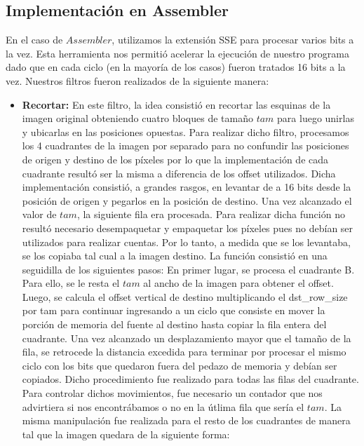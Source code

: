 \documentclass[10pt, a4paper]{article}
\begin{document}
\subsection{Implementación en Assembler}
En el caso de $Assembler$, utilizamos la extensión SSE para procesar varios bits a la vez. Esta herramienta nos permitió acelerar la ejecución de nuestro programa dado que en cada ciclo (en la mayoría de los casos) fueron tratados 16 bits a la vez.\newline
Nuestros filtros fueron realizados de la siguiente manera:
\begin{itemize}
\item {\textbf{Recortar:}}
En este filtro, la idea consistió en recortar las esquinas de la imagen original obteniendo cuatro bloques de tamaño $tam$ para luego unirlas y ubicarlas en las posiciones opuestas.\newline
Para realizar dicho filtro, procesamos los 4 cuadrantes de la imagen por separado para no confundir las posiciones de origen y destino de los píxeles por lo que la implementación de cada cuadrante resultó ser la misma a diferencia de los offset utilizados.\newline
Dicha implementación consistió, a grandes rasgos, en levantar de a 16 bits desde la posición de origen y pegarlos en la posición de destino. Una vez alcanzado el valor de $tam$, la siguiente fila era procesada.	\newline
Para realizar dicha función no resultó necesario desempaquetar y empaquetar los píxeles pues no debían ser utilizados para realizar cuentas. Por lo tanto, a medida que se los levantaba, se los copiaba tal cual a la imagen destino.\newline
\newline
La función consistió en una seguidilla de los siguientes pasos:\newline
En primer lugar, se procesa el cuadrante B. Para ello, se le resta el $tam$ al ancho de la imagen para obtener el offset. Luego, se calcula el offset vertical de destino multiplicando el dst\_row\_size por tam para continuar ingresando a un ciclo que consiste en mover la porción de memoria del fuente al destino hasta copiar la fila entera del cuadrante. Una vez alcanzado un desplazamiento mayor que el tamaño de la fila, se retrocede la distancia excedida para terminar por procesar el mismo ciclo con los bits que quedaron fuera del pedazo de memoria y debían ser copiados. Dicho procedimiento fue realizado para todas las filas del cuadrante. Para controlar dichos movimientos, fue necesario un contador que nos advirtiera si nos encontrábamos o no en la útlima fila que sería el $tam$.\newline
La misma manipulación fue realizada para el resto de los cuadrantes de manera tal que la imagen quedara de la siguiente forma:\newline


\end{itemize}
\end{document}
